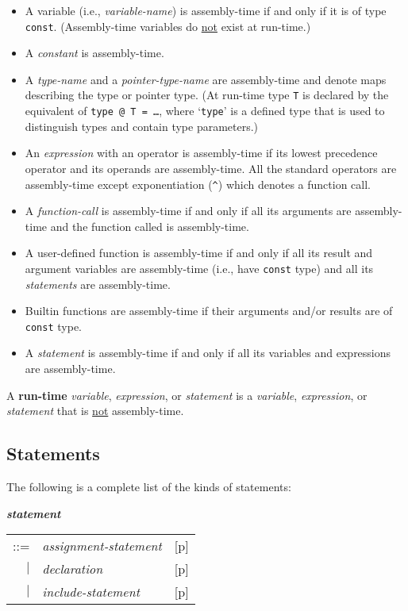 \documentclass[12pt]{article}
\newcommand{\key}[1]{{\rm \bfseries #1}}
\newcommand{\emkey}[1]{{\em \bfseries #1}}
\newcommand{\pagref}[1]{p\pageref{#1}}
\newenvironment{indpar}[1][0.3in]%
	{\begin{list}{}%
		     {\setlength{\itemsep}{0in}%
		      \setlength{\topsep}{0in}%
		      \setlength{\parsep}{1ex}%
		      \setlength{\labelwidth}{#1}%
		      \setlength{\leftmargin}{#1}%
		      \addtolength{\leftmargin}{\labelsep}}%
	 \item}%
	{\end{list}}
\begin{document}
\begin{itemize}
\item A variable (i.e., {\em variable-name})
is assembly-time if and only if it is of type {\tt const}.
(Assembly-time variables do \underline{not} exist at run-time.)
\item A {\em constant} is assembly-time.
\item A {\em type-name} and a {\em pointer-type-name} are assembly-time
and denote maps describing the type or pointer type.
(At run-time type {\tt T} is declared by the
equivalent of {\tt type @ T = \ldots}, where `{\tt type}' is a
defined type that is
used to distinguish types and contain type parameters.)
\item An {\em expression} with an operator is
      assembly-time if its lowest precedence operator
      and its operands are assembly-time.
      All the standard operators are assembly-time except exponentiation
      ({\tt \textasciicircum}) which denotes a function call.
\item A {\em function-call} is assembly-time if and only if all its
      arguments are assembly-time and the function called is
      assembly-time.
\item A user-defined function is assembly-time if and only if all its
      result and argument variables are assembly-time (i.e., have
      {\tt const} type) and all its
      {\em statements} are assembly-time.
\item Builtin functions are assembly-time if their arguments and/or
      results are of {\tt const} type.
\item A {\em statement} is assembly-time if and only if all its
      variables and expressions are assem\-bly-time.
\end{itemize}

A \key{run-time} {\em variable}, {\em expression}, or {\em statement}
is a {\em variable}, {\em expression}, or {\em statement} that is
\underline{not} assembly-time.

\subsection{Statements}
\label{STATEMENTS}

The following is a complete list of the kinds of statements:
\begin{indpar}
\emkey{statement}\label{STATEMENT}
    \begin{tabular}[t]{@{}rll}
    ::= & {\em assignment-statement}
        & [\pagref{ASSIGNMENT-STATEMENTS}] \\
    $|$ & {\em declaration}
        & [\pagref{DECLARATIONS}] \\
    $|$ & {\em include-statement}
        & [\pagref{INCLUDE-STATEMENTS}] \\
    \end{tabular}
\end{indpar}
\end{document}

